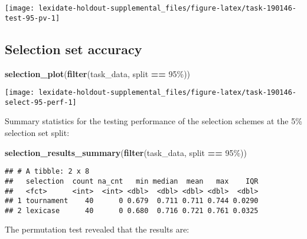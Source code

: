 \documentclass[
]{book}
\newenvironment{Shaded}{\begin{snugshade}}{\end{snugshade}}
\newcommand{\FunctionTok}[1]{\textcolor[rgb]{0.13,0.29,0.53}{\textbf{#1}}}
\newcommand{\NormalTok}[1]{#1}
\newcommand{\SpecialCharTok}[1]{\textcolor[rgb]{0.81,0.36,0.00}{\textbf{#1}}}
\newcommand{\StringTok}[1]{\textcolor[rgb]{0.31,0.60,0.02}{#1}}
\begin{document}
\texttt{[image: lexidate-holdout-supplemental\_files/figure-latex/task-190146-test-95-pv-1]}

\hypertarget{selection-set-accuracy-19}{%
\subsection{Selection set accuracy}\label{selection-set-accuracy-19}}

\begin{Shaded}
\begin{Highlighting}[]
\FunctionTok{selection\_plot}\NormalTok{(}\FunctionTok{filter}\NormalTok{(task\_data, split }\SpecialCharTok{==} \StringTok{\textquotesingle{}95\%\textquotesingle{}}\NormalTok{))}
\end{Highlighting}
\end{Shaded}

\texttt{[image: lexidate-holdout-supplemental\_files/figure-latex/task-190146-select-95-perf-1]}

Summary statistics for the testing performance of the selection schemes at the 5\% selection set split:

\begin{Shaded}
\begin{Highlighting}[]
\FunctionTok{selection\_results\_summary}\NormalTok{(}\FunctionTok{filter}\NormalTok{(task\_data, split }\SpecialCharTok{==} \StringTok{\textquotesingle{}95\%\textquotesingle{}}\NormalTok{))}
\end{Highlighting}
\end{Shaded}

\begin{verbatim}
## # A tibble: 2 x 8
##   selection  count na_cnt   min median  mean   max    IQR
##   <fct>      <int>  <int> <dbl>  <dbl> <dbl> <dbl>  <dbl>
## 1 tournament    40      0 0.679  0.711 0.711 0.744 0.0290
## 2 lexicase      40      0 0.680  0.716 0.721 0.761 0.0325
\end{verbatim}

The permutation test revealed that the results are:
\end{document}
